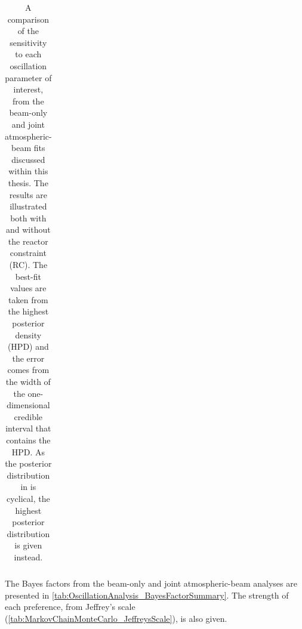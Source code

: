 \begin{table}[ht!]
\begin{tabular}{|l|c|c|c|c|}
  \end{tabular}
  \caption{A comparison of the sensitivity to each oscillation parameter of interest, from the beam-only \cite{Dunne2020-uf, t2k_tn_393} and joint atmospheric-beam fits discussed within this thesis. The results are illustrated both with and without the reactor constraint (RC). The best-fit values are taken from the highest posterior density (HPD) and the error comes from the width of the one-dimensional \quickmath{1\sigma} credible interval that contains the HPD. As the posterior distribution in  is cyclical, the highest posterior distribution is given instead.}
  \label{tab:OscillationAnalysis_MeasurementSummary}
  \endgroup
\end{table}

The Bayes factors from the beam-only and joint atmospheric-beam analyses are presented in \autoref{tab:OscillationAnalysis_BayesFactorSummary}. The strength of each preference, from Jeffrey's scale (\autoref{tab:MarkovChainMonteCarlo_JeffreysScale}), is also given.

